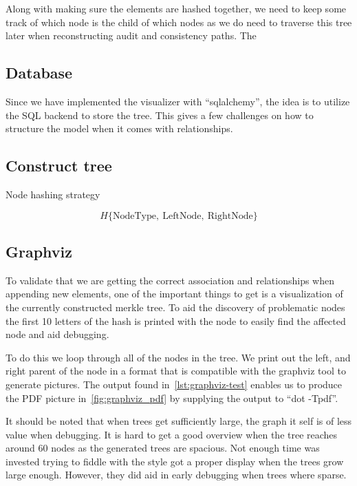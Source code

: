 \documentclass[../Main/thesis.tex]{subfiles}
\begin{document}
Along with making sure the elements are hashed together, we need to keep some
track of which node is the child of which nodes as we do need to traverse
this tree later when reconstructing audit and consistency paths. The 


\subsection*{Database}%
\label{sub:database}
Since we have implemented the visualizer with ``sqlalchemy'', the idea is to
utilize the SQL backend to store the tree. This gives a few challenges on how to
structure the model when it comes with relationships.

\subsection*{Construct tree}%
\label{sub:construct_tree}



\begin{listing}[H]
\caption{Node hashing strategy}
\label{lst:node_hashing_strategy}
\begin{equation*}
H\{\text{NodeType},\ \text{LeftNode},\ \text{RightNode}\}
\end{equation*}
\end{listing}

\subsection*{Graphviz}%
\label{sub:graph_merkle_tree}
To validate that we are getting the correct association and relationships when
appending new elements, one of the important things to get is a visualization of
the currently constructed merkle tree. To aid the discovery of problematic nodes
the first 10 letters of the hash is printed with the node to easily find the
affected node and aid debugging.

To do this we loop through all of the nodes in the tree. We print out the left,
and right parent of the node in a format that is compatible with the graphviz
tool to generate pictures. The output found in~\ref{lst:graphviz-test} enables
us to produce the PDF picture in~\ref{fig:graphviz_pdf} by supplying the output
to ``dot -Tpdf''.

It should be noted that when trees get sufficiently large, the graph it self is
of less value when debugging. It is hard to get a good overview when the tree
reaches around 60 nodes as the generated trees are spacious. Not enough time was
invested trying to fiddle with the style got a proper display when the trees
grow large enough. However, they did aid in early debugging when trees where
sparse.
\end{document}
